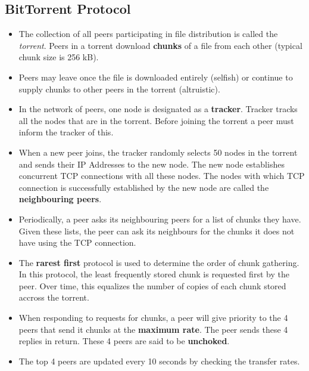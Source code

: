 \documentclass{article}
\theoremstyle{plain}
\theoremstyle{definition}
\begin{document}
\subsection{BitTorrent Protocol}
\begin{itemize}
    \item The collection of all peers participating in file distribution is called the \textit{torrent}. Peers in a torrent download \textbf{chunks} of a file from each other (typical chunk size is 256 kB). 
    
    \item Peers may leave once the file is downloaded entirely (selfish) or continue to supply chunks to other peers in the torrent (altruistic).
    
    \item In the network of peers, one node is designated as a \textbf{tracker}. Tracker tracks all the nodes that are in the torrent. Before joining the torrent a peer must inform the tracker of this. 
    
    \item When a new peer joins, the tracker randomly selects 50 nodes in the torrent and sends their IP Addresses to the new node. The new node establishes concurrent TCP connections with all these nodes. The nodes with which TCP connection is successfully established by the new node are called the \textbf{neighbouring peers}. 
    
    \item Periodically, a peer asks its neighbouring peers for a list of chunks they have. Given these lists, the peer can ask its neighbours for the chunks it does not have using the TCP connection.
    
    \item The \textbf{rarest first} protocol is used to determine the order of chunk gathering. In this protocol, the least frequently stored chunk is requested first by the peer. Over time, this equalizes the number of copies of each chunk stored accross the torrent. 
    
    \item When responding to requests for chunks, a peer will give priority to the 4 peers that send it chunks at the \textbf{maximum rate}. The peer sends these 4 replies in return. These 4 peers are said to be \textbf{unchoked}.
    
    \item The top 4 peers are updated every 10 seconds by checking the transfer rates. 
    

\end{itemize}
\end{document}
